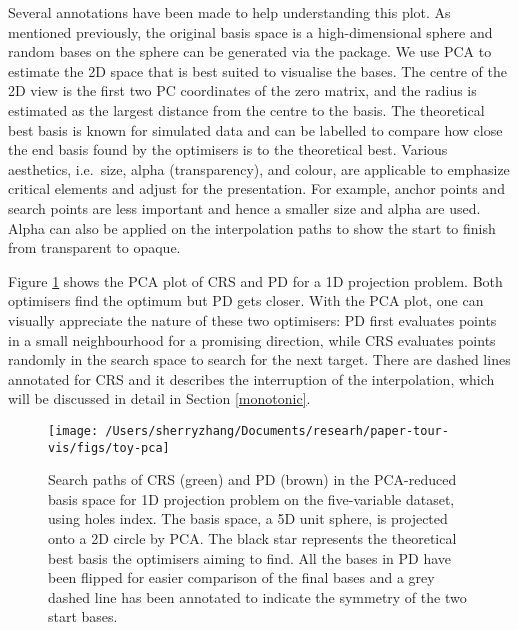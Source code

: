 Several annotations have been made to help understanding this plot. As
mentioned previously, the original basis space is a high-dimensional
sphere and random bases on the sphere can be generated via the
 \citep{geozoo} package. We use PCA to estimate the 2D
space that is best suited to visualise the bases. The centre of the 2D
view is the first two PC coordinates of the zero matrix, and the radius
is estimated as the largest distance from the centre to the basis. The
theoretical best basis is known for simulated data and can be labelled
to compare how close the end basis found by the optimisers is to the
theoretical best. Various aesthetics, i.e.~size, alpha (transparency),
and colour, are applicable to emphasize critical elements and adjust for
the presentation. For example, anchor points and search points are less
important and hence a smaller size and alpha are used. Alpha can also be
applied on the interpolation paths to show the start to finish from
transparent to opaque.

Figure \ref{fig:toy-pca} shows the PCA plot of CRS and PD for a 1D
projection problem. Both optimisers find the optimum but PD gets closer.
With the PCA plot, one can visually appreciate the nature of these two
optimisers: PD first evaluates points in a small neighbourhood for a
promising direction, while CRS evaluates points randomly in the search
space to search for the next target. There are dashed lines annotated
for CRS and it describes the interruption of the interpolation, which
will be discussed in detail in Section \ref{monotonic}.

\begin{Schunk}
\begin{figure}

{\centering \texttt{[image: /Users/sherryzhang/Documents/researh/paper-tour-vis/figs/toy-pca]} 

}

\caption[Search paths of CRS (green) and PD (brown) in the PCA-reduced basis space for 1D projection problem on the five-variable dataset,  using holes index]{Search paths of CRS (green) and PD (brown) in the PCA-reduced basis space for 1D projection problem on the five-variable dataset,  using holes index. The basis space, a 5D unit sphere, is projected onto a 2D circle by PCA. The black star represents the theoretical best basis the optimisers aiming to find. All the bases in PD have been flipped for easier comparison of the final bases and a grey dashed line has been annotated to indicate the symmetry of the two start bases.}\label{fig:toy-pca}
\end{figure}
\end{Schunk}

